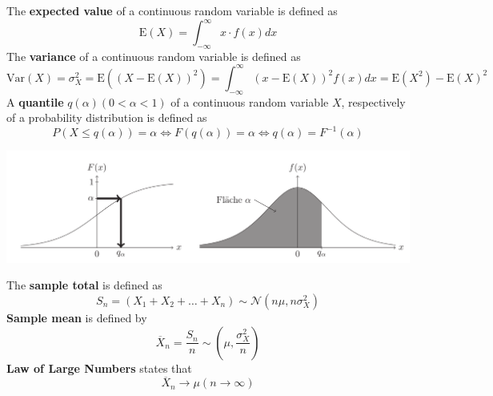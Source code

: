 \documentclass[11pt]{article}
\theoremstyle{definition}
\newcommand\sample[1]{\overline{#1}}
\begin{document}
\begin{definition}
	The \textbf{expected value} of a continuous random variable is defined as
	\begin{equation*}
			\text{E}(X) = \int_{-\infty}^{\infty} x\cdot f(x) dx
	\end{equation*}
	The \textbf{variance} of a continuous random variable is defined as
	\begin{equation*}
		\text{Var}(X) = \sigma_X^2 = \text{E}((X - \text{E}(X))^2) = \int_{-\infty}^{\infty} (x - \text{E}(X))^2 f(x) dx = \text{E}(X^2) - \text{E}(X)^2
	\end{equation*}
	A \textbf{quantile} $q(\alpha) (0<\alpha<1)$ of a continuous random variable $X$, respectively of a probability distribution is defined as
	\begin{equation*}
		P(X\leq q(\alpha)) = \alpha \Leftrightarrow F(q(\alpha)) = \alpha \Leftrightarrow q(\alpha) = F^{-1}(\alpha)
	\end{equation*}
\end{definition}

\begin{center}
	\includegraphics[width=0.8\linewidth]{img/quantile}
\end{center}

\begin{definition}
	The \textbf{sample total} is defined as 
	\begin{equation*}
		S_n = (X_1 + X_2 + \dots + X_n) \sim \mathcal{N}(n\mu, n\sigma_X^2)
	\end{equation*}
	\textbf{Sample mean} is defined by
	\begin{equation*}
		\sample{X}_n = \frac{S_n}{n} \sim(\mu, \frac{\sigma_X^2}{n})
	\end{equation*}
	\textbf{Law of Large Numbers} states that
	\begin{equation*}
		\sample{X}_n \longrightarrow \mu(n\rightarrow \infty)
	\end{equation*}
\end{definition}



\end{document}
